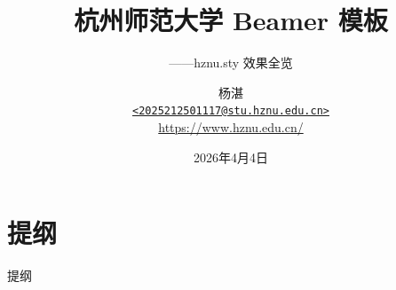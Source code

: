 \documentclass[10pt,aspectratio=169]{beamer}
\title[杭州师范大学 Beamer 模板]{杭州师范大学 Beamer 模板}
\subtitle{——hznu.sty 效果全览}
\author[Yeung Zhaam]{%
  \texorpdfstring{%
    杨湛 \\\medskip
    {\small
      \href{mailto:2025212501117@stu.hznu.edu.cn}
        {\nolinkurl{<2025212501117@stu.hznu.edu.cn>}}%
    } \\
    {\small \url{https://www.hznu.edu.cn/}}%
  }{杨湛}%
}
\institute[数学学院]{%
  数学学院 \\
  杭州师范大学%
}
\date[Apr. 4, 2026]{2026年4月4日}
\begin{document}
\begin{frame}[plain]
  \titlepage
\end{frame}

\section{提纲}
\begin{frame}{提纲}
  \tableofcontents
\end{frame}

\end{document}
